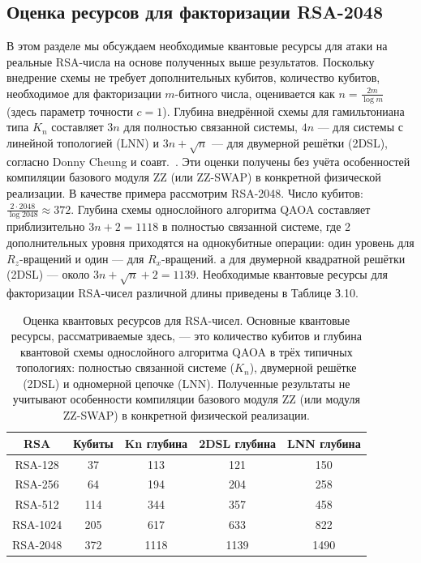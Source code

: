 \subsection*{Оценка ресурсов для факторизации RSA-2048}

В этом разделе мы обсуждаем необходимые квантовые ресурсы для атаки на реальные
RSA-числа на основе полученных выше результатов. Поскольку внедрение схемы не
требует дополнительных кубитов, количество кубитов, необходимое для
факторизации $m$-битного числа, оценивается как $n = \frac{2m}{\log m}$ (здесь
параметр точности $c = 1$). Глубина внедрённой схемы для гамильтониана типа
$K_n$ составляет $3n$ для полностью связанной системы, $4n$ — для системы с
линейной топологией (LNN) и $3n + \sqrt{n}$ — для двумерной решётки (2DSL),
согласно Donny Cheung и соавт.~\cite{cite_55}. Эти оценки получены без учёта
особенностей компиляции базового модуля ZZ (или ZZ-SWAP) в конкретной
физической реализации. В качестве примера рассмотрим RSA-2048. Число кубитов:
$\frac{2 \cdot 2048}{\log 2048} \approx 372$. Глубина схемы однослойного
алгоритма QAOA составляет приблизительно $3n + 2 = 1118$ в полностью связанной
системе, где 2 дополнительных уровня приходятся на однокубитные операции: один
уровень для $R_z$-вращений и один — для $R_x$-вращений. а для двумерной
квадратной решётки (2DSL) — около $3n + \sqrt{n} + 2 = 1139$. Необходимые
квантовые ресурсы для факторизации RSA-чисел различной длины приведены в
Таблице З.10.

\begin{table}[H]
\centering
\caption{
    Оценка квантовых ресурсов для RSA-чисел. Основные квантовые ресурсы,
    рассматриваемые здесь, — это количество кубитов и глубина квантовой схемы
    однослойного алгоритма QAOA в трёх типичных топологиях: полностью связанной
    системе ($K_n$), двумерной решётке (2DSL) и одномерной цепочке (LNN).
    Полученные результаты не учитывают особенности компиляции базового модуля
    ZZ (или модуля ZZ-SWAP) в конкретной физической реализации.
}
\begin{tabular}{c|c|c|c|c}
\hline
\hline
\textbf{RSA } & \textbf{Кубиты} & \textbf{Kn глубина} & \textbf{2DSL глубина} & \textbf{LNN глубина} \\
\hline
RSA-128  &  37  & 113  & 121  & 150 \\
RSA-256  &  64  & 194  & 204  & 258 \\
RSA-512  & 114  & 344  & 357  & 458 \\
RSA-1024 & 205  & 617  & 633  & 822 \\
RSA-2048 & 372  & 1118 & 1139 & 1490 \\
\hline
\hline
\end{tabular}
\end{table}

